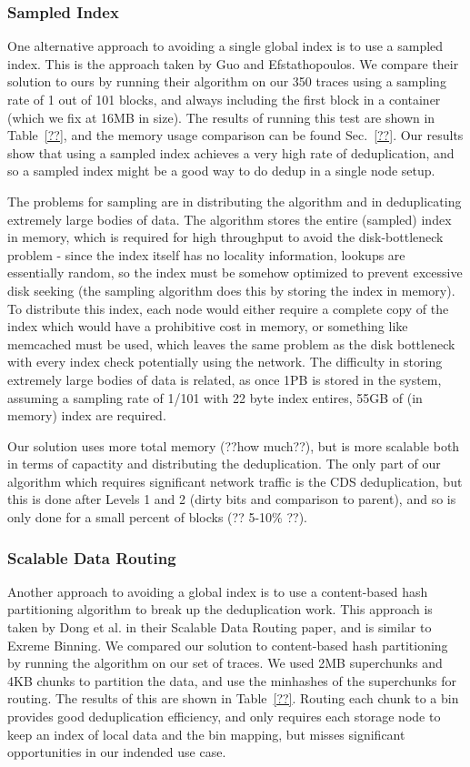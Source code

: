 \subsubsection{Sampled Index}
One alternative approach to avoiding a single global index is to use a sampled
index. This is the approach taken by Guo and Efstathopoulos\cite{Guo2011}. We
compare their solution to ours by running their algorithm on our 350 traces
using a sampling rate of 1 out of 101 blocks, and always including the first
block in a container (which we fix at 16MB in size). The results of running this
test are shown in Table~\ref{??}, and the memory usage comparison can be found
Sec.~\ref{??}. Our results show that using a sampled index achieves a very high
rate of deduplication, and so a sampled index might be a good way to do dedup
in a single node setup.

The problems for sampling are in distributing the
algorithm and in deduplicating extremely large bodies of data. The algorithm
stores the entire (sampled) index in memory, which is required for high
throughput to avoid the disk-bottleneck problem - since the index itself has no
locality information, lookups are essentially random, so the index must be
somehow optimized to prevent excessive disk seeking (the sampling algorithm does
this by storing the index in memory). To distribute this index, each node would
either require a complete copy of the index which would have a prohibitive cost in
memory, or something like memcached must be used, which leaves the same problem
as the disk bottleneck with every index check potentially using the network.
The difficulty in storing extremely large bodies of data
is related, as once 1PB is stored in the system, assuming a sampling rate of 
1/101 with 22 byte index entires, 55GB of (in memory) index are required.

Our solution uses more total memory (??how much??), but is more scalable both in
terms of capactity and distributing the deduplication. The only part of our
algorithm which requires significant network traffic is the CDS deduplication,
but this is done after Levels 1 and 2 (dirty bits and comparison to parent), and
so is only done for a small percent of blocks (?? 5-10\% ??).

\subsubsection{Scalable Data Routing}
Another approach to avoiding a global index is to use a content-based hash
partitioning algorithm to break up the deduplication work. This approach is
taken by Dong et al. in their Scalable Data Routing paper, and is similar to
Exreme Binning\cite{??}\cite{extreme_binning09}. We compared our solution to
content-based hash partitioning by running the algorithm on our set of 
traces. We used 2MB superchunks and 4KB chunks to partition the data, and use
the minhashes of the superchunks for routing. The results of this are shown in
Table~\ref{??}. Routing each chunk to a bin provides good deduplication
efficiency, and only requires each storage node to keep an index of local data
and the bin mapping, but misses significant opportunities in our indended use
case.

